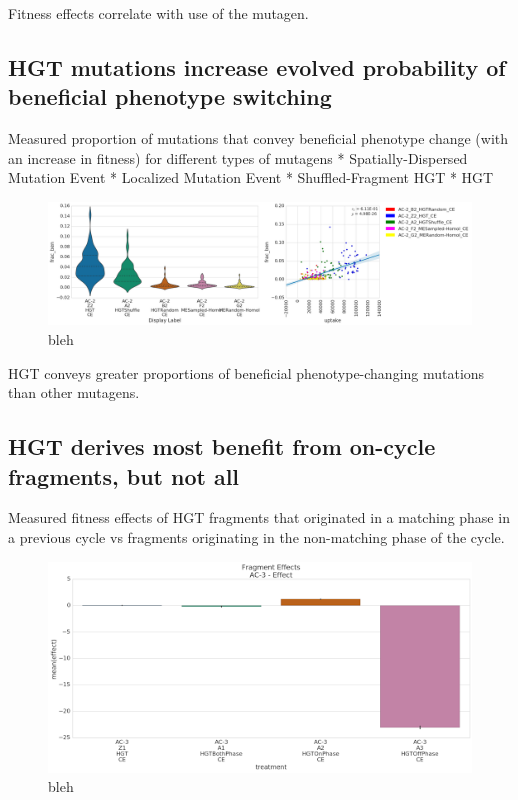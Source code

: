 \documentclass[PhD]{msu-thesis}
\begin{document}
Fitness effects correlate with use of the mutagen.

\subsection{HGT mutations increase evolved probability of beneficial phenotype switching}
Measured proportion of mutations that convey beneficial phenotype change (with an increase in fitness) for different types of mutagens
* Spatially-Dispersed Mutation Event
* Localized Mutation Event
* Shuffled-Fragment HGT
* HGT


\begin{figure}[h!]
\begin{center}
\includegraphics[width=0.7\columnwidth]{figures/HGT/mutagen_use_vs_fraction_beneficial.png}
\caption{bleh
}\label{fig:mutagen_use_vs_fraction_beneficial}
\end{center}
\end{figure}

HGT conveys greater proportions of beneficial phenotype-changing mutations than other mutagens.


\subsection{HGT derives most benefit from on-cycle fragments, but not all}
Measured fitness effects of HGT fragments that originated in a matching phase in a previous cycle vs fragments originating in the non-matching phase of the cycle.


\begin{figure}[h!]
\begin{center}
\includegraphics[width=0.7\columnwidth]{figures/HGT/fitness_effect_by_cycle_phase_source.png}
\caption{bleh
}\label{fig:fitness_effect_by_cycle_phase_source}
\end{center}
\end{figure}
\end{document}
